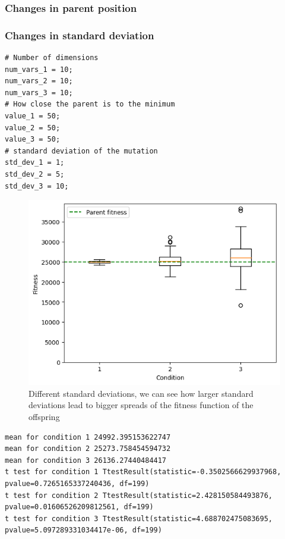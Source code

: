 \subsubsection{Changes in parent position}


\subsubsection{Changes in standard deviation}
\begin{lstlisting}
# Number of dimensions
num_vars_1 = 10;
num_vars_2 = 10;
num_vars_3 = 10;
# How close the parent is to the minimum
value_1 = 50;
value_2 = 50;
value_3 = 50;
# standard deviation of the mutation
std_dev_1 = 1;
std_dev_2 = 5;
std_dev_3 = 10;
\end{lstlisting}
\begin{figure}[H]
    \centering
    \includegraphics[width=\linewidth]{images/lab1/diff_var.png}
    \caption{Different standard deviations, we can see how larger standard deviations lead to bigger spreads of the fitness function of the offspring}
\end{figure}
\begin{lstlisting}
mean for condition 1 24992.395153622747
mean for condition 2 25273.758454594732
mean for condition 3 26136.27440484417
t test for condition 1 TtestResult(statistic=-0.3502566629937968, pvalue=0.7265165337240436, df=199)
t test for condition 2 TtestResult(statistic=2.428150584493876, pvalue=0.01606526209812561, df=199)
t test for condition 3 TtestResult(statistic=4.688702475083695, pvalue=5.097289331034417e-06, df=199)
\end{lstlisting}


